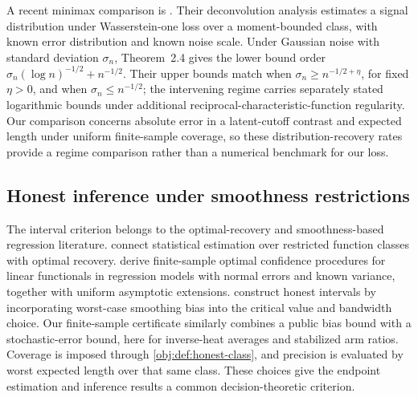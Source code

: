 A recent minimax comparison is \citet[Section~2, Theorems~2.4--2.6]{DurotMukherjee2026VanishingNoise}. Their deconvolution analysis estimates a signal distribution under Wasserstein-one loss over a moment-bounded class, with known error distribution and known noise scale. Under Gaussian noise with standard deviation \(\sigma_n\), Theorem~2.4 gives the lower bound order \(\sigma_n(\log n)^{-1/2}+n^{-1/2}\). Their upper bounds match when \(\sigma_n\ge n^{-1/2+\eta}\), for fixed \(\eta>0\), and when \(\sigma_n\le n^{-1/2}\); the intervening regime carries separately stated logarithmic bounds under additional reciprocal-characteristic-function regularity. Our comparison concerns absolute error in a latent-cutoff contrast and expected length under uniform finite-sample coverage, so these distribution-recovery rates provide a regime comparison rather than a numerical benchmark for our loss.

\subsection{Honest inference under smoothness restrictions}

The interval criterion belongs to the optimal-recovery and smoothness-based regression literature. \citet{Donoho1994} connect statistical estimation over restricted function classes with optimal recovery. \citet{ArmstrongKolesar2018OptimalInference} derive finite-sample optimal confidence procedures for linear functionals in regression models with normal errors and known variance, together with uniform asymptotic extensions. \citet{ArmstrongKolesar2020SimpleHonest} construct honest intervals by incorporating worst-case smoothing bias into the critical value and bandwidth choice. Our finite-sample certificate similarly combines a public bias bound with a stochastic-error bound, here for inverse-heat averages and stabilized arm ratios. Coverage is imposed through \cref{obj:def:honest-class}, and precision is evaluated by worst expected length over that same class. These choices give the endpoint estimation and inference results a common decision-theoretic criterion.
